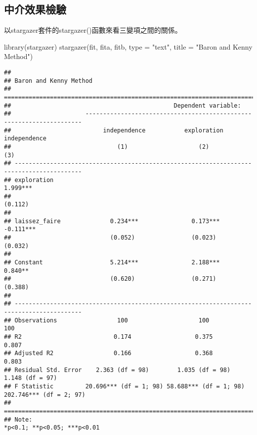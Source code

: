 \documentclass[
]{book}
\newenvironment{Shaded}{\begin{snugshade}}{\end{snugshade}}
\newcommand{\AttributeTok}[1]{\textcolor[rgb]{0.77,0.63,0.00}{#1}}
\newcommand{\FunctionTok}[1]{\textcolor[rgb]{0.00,0.00,0.00}{#1}}
\newcommand{\NormalTok}[1]{#1}
\newcommand{\StringTok}[1]{\textcolor[rgb]{0.31,0.60,0.02}{#1}}
\begin{document}
\hypertarget{ux4e2dux4ecbux6548ux679cux6aa2ux9a57}{%
\subsection{中介效果檢驗}\label{ux4e2dux4ecbux6548ux679cux6aa2ux9a57}}

以stargazer套件的stargazer()函數來看三變項之間的關係。

\begin{Shaded}
\begin{Highlighting}[]
\FunctionTok{library}\NormalTok{(stargazer)}
\FunctionTok{stargazer}\NormalTok{(fit, fita, fitb, }\AttributeTok{type =} \StringTok{"text"}\NormalTok{, }\AttributeTok{title =} \StringTok{"Baron and Kenny Method"}\NormalTok{)}
\end{Highlighting}
\end{Shaded}

\begin{verbatim}
## 
## Baron and Kenny Method
## =========================================================================================
##                                              Dependent variable:                         
##                     ---------------------------------------------------------------------
##                          independence           exploration            independence      
##                              (1)                    (2)                     (3)          
## -----------------------------------------------------------------------------------------
## exploration                                                              1.999***        
##                                                                           (0.112)        
##                                                                                          
## laissez_faire              0.234***               0.173***               -0.111***       
##                            (0.052)                (0.023)                 (0.032)        
##                                                                                          
## Constant                   5.214***               2.188***                0.840**        
##                            (0.620)                (0.271)                 (0.388)        
##                                                                                          
## -----------------------------------------------------------------------------------------
## Observations                 100                    100                     100          
## R2                          0.174                  0.375                   0.807         
## Adjusted R2                 0.166                  0.368                   0.803         
## Residual Std. Error    2.363 (df = 98)        1.035 (df = 98)         1.148 (df = 97)    
## F Statistic         20.696*** (df = 1; 98) 58.688*** (df = 1; 98) 202.746*** (df = 2; 97)
## =========================================================================================
## Note:                                                         *p<0.1; **p<0.05; ***p<0.01
\end{verbatim}
\end{document}
